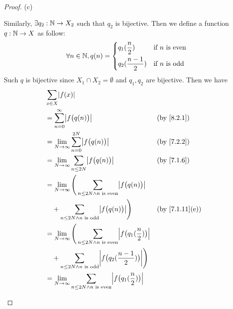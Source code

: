 \begin{proof}{(c)}
\begin{itemize}
          Similarly, \(\exists q_2 : \mathbb{N} \to X_2\) such that \(q_2\) is bijective.
          Then we define a function \(q : \mathbb{N} \to X\) as follow:
          \[
            \forall n \in \mathbb{N}, q(n) = \begin{dcases}
              q_1(\dfrac{n}{2})     & \text{if } n \text{ is even} \\
              q_2(\dfrac{n - 1}{2}) & \text{if } n \text{ is odd}
            \end{dcases}
          \]
          Such \(q\) is bijective since \(X_1 \cap X_2 = \emptyset\) and \(q_1, q_2\) are bijective.
          Then we have
          \begin{align*}
             & \sum_{x \in X} \abs{f(x)}                                                                                                                                   \\
             & = \sum_{n = 0}^\infty \abs{f\big(q(n)\big)}                                                                               &  & \by{8.2.1}                   \\
             & = \lim_{N \to \infty} \sum_{n = 0}^{2N} \abs{f\big(q(n)\big)}                                                             &  & \by{7.2.2}                   \\
             & = \lim_{N \to \infty} \sum_{n \leq 2N} \abs{f\big(q(n)\big)}                                                              &  & \by{7.1.6}                   \\
             & = \lim_{N \to \infty} \Bigg(\sum_{n \leq 2N \land n \text{ is even}} \abs{f\big(q(n)\big)}                                                                  \\
             & \quad + \sum_{n \leq 2N \land n \text{ is odd}} \abs{f\big(q(n)\big)}\Bigg)                                               &  & \text{(by \cref{7.1.11}(e))} \\
             & = \lim_{N \to \infty} \Bigg(\sum_{n \leq 2N \land n \text{ is even}} \abs{f\big(q_1(\dfrac{n}{2})\big)}                                                     \\
             & \quad + \sum_{n \leq 2N \land n \text{ is odd}} \abs{f\big(q_2(\dfrac{n - 1}{2})\big)}\Bigg)                                                                \\
             & = \lim_{N \to \infty} \sum_{n \leq 2N \land n \text{ is even}} \abs{f\big(q_1(\dfrac{n}{2})\big)}                                                           \\

\end{align*}
\end{itemize}
\end{proof}
